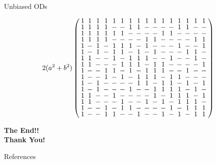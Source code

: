 \documentclass{beamer}
\begin{document}
\begin{frame}{Unbiased ODs}
  
  \[
    2(a^2+b^2)
    \arraycolsep=2.0pt\def\arraystretch{0.75}
    \left(
      \begin{array}{cccccccccccccccc}
        1&1&1&1&1&1&1&1&1&1&1&1&1&1&1&1\\
        1&1&1&1&-&-&1&1&-&-&-&-&1&1&-&-\\
        1&1&1&1&1&1&-&-&-&-&1&1&-&-&-&-\\
        1&1&1&1&-&-&-&-&1&1&-&-&-&-&1&1\\
        1&-&1&-&1&1&1&-&1&-&-&-&1&-&-&1\\
        1&-&1&-&1&1&-&1&-&1&-&-&-&1&1&-\\
        1&1&-&-&1&-&1&1&1&-&-&1&-&-&1&-\\
        1&1&-&-&-&1&1&1&-&1&1&-&-&-&-&1\\
        1&-&-&1&1&-&1&-&1&1&1&-&-&1&-&-\\
        1&-&-&1&-&1&-&1&1&1&-&1&1&-&-&-\\
        1&-&1&-&-&-&-&1&1&-&1&1&-&1&-&1\\
        1&-&1&-&-&-&1&-&-&1&1&1&1&-&1&-\\
        1&1&-&-&1&-&-&-&-&1&-&1&1&1&-&1\\
        1&1&-&-&-&1&-&-&1&-&1&-&1&1&1&-\\
        1&-&-&1&-&1&1&-&-&-&-&1&-&1&1&1\\
        1&-&-&1&1&-&-&1&-&-&1&-&1&-&1&1\\
      \end{array}
    \right)
  \]

\end{frame}


\begin{frame}

  \begin{center}
    {\huge\bf The End!!}\\
    
    {\bf Thank You!}
  \end{center}

\end{frame}

\begin{frame}{References}
  
  
\end{frame}
\end{document}
